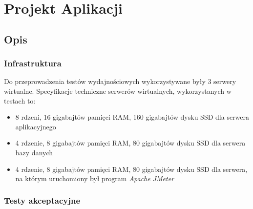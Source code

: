\chapter{Projekt Aplikacji}
\section{Opis}
\subsection{Infrastruktura}
Do przeprowadzenia testów wydajnościowych wykorzystywane były 3 serwery wirtualne. Specyfikacje techniczne serwerów wirtualnych, wykorzystanych w testach to: 
\begin{itemize}
    \item 8 rdzeni, 16 gigabajtów pamięci RAM, 160 gigabajtów dysku SSD dla serwera aplikacyjnego
    \item 4 rdzenie, 8 gigabajtów pamięci RAM, 80 gigabajtów dysku SSD dla serwera bazy danych 
    \item 4 rdzenie, 8 gigabajtów pamięci RAM, 80 gigabajtów dysku SSD dla serwera, na którym uruchomiony był program \textsl{Apache JMeter}
\end{itemize}

\subsection{Testy akceptacyjne}
